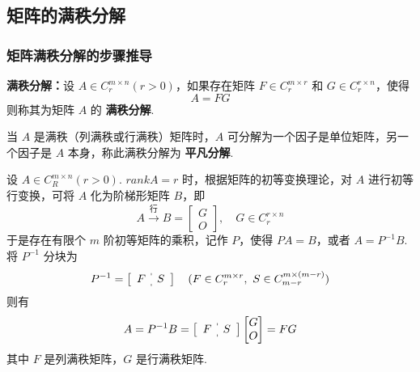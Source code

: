    \subsection{矩阵的满秩分解}
        \subsubsection{矩阵满秩分解的步骤推导}
            \par \textbf{满秩分解：}设 $A \in C_r^{m \times n}(r > 0)$，如果存在矩阵 $F \in C_r^{m \times r}$ 和 $G \in C_r^{r \times n}$，使得
            \begin{equation*}
                A = FG
            \end{equation*}
            则称其为矩阵 $A$ 的 \textbf{满秩分解}.
            \par 当 $A$ 是满秩（列满秩或行满秩）矩阵时，$A$ 可分解为一个因子是单位矩阵，另一个因子是 $A$ 本身，称此满秩分解为 \textbf{平凡分解}.
            \par 设 $A \in C_R^{m \times n}(r > 0)$. $rankA = r$ 时，根据矩阵的初等变换理论，对 $A$ 进行初等行变换，可将 $A$ 化为阶梯形矩阵 $B$，即
            \begin{equation*}
                A \stackrel{\text{行}}{\longrightarrow} B = \begin{bmatrix}
                    G \\ O
                \end{bmatrix}, \quad G \in C_r^{r \times n}
            \end{equation*}
            于是存在有限个 $m$ 阶初等矩阵的乘积，记作 $P$，使得 $PA = B$，或者 $A = P^{-1}B$. 将 $P^{-1}$ 分块为
            \begin{equation*}
                P^{-1} = \left[\begin{array}{c:c} F & S \end{array}\right] \quad (F \in C_r^{m \times r}, \ S \in C_{m-r}^{m \times (m-r)})
            \end{equation*}
            则有
            \begin{equation*}
                A = P^{-1}B = \left[\begin{array}{c:c} F & S \end{array}\right]\begin{bmatrix}
                    G \\ O
                \end{bmatrix} = FG
            \end{equation*}
            其中 $F$ 是列满秩矩阵，$G$ 是行满秩矩阵.
